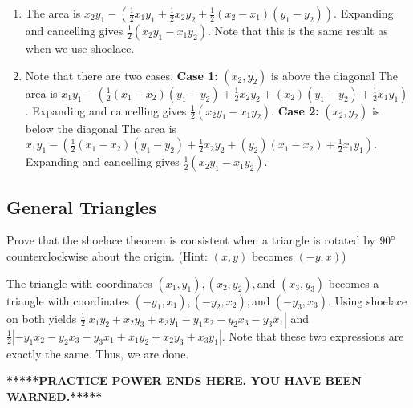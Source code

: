 \documentclass[11pt]{article}
\begin{document}
\begin{solution}
\begin{enumerate}[label=(\alph*)]
\phantom{hello what's up}
\item The area is $x_2y_1 - (\frac{1}{2}x_1y_1+\frac{1}{2}x_2y_2+\frac{1}{2}(x_2-x_1)(y_1-y_2))$.
Expanding and cancelling gives $\frac{1}{2}(x_2y_1-x_1y_2)$. Note that this is the same result as when we use shoelace.

\item Note that there are two cases. 
\newline \textbf{Case 1:} $(x_2, y_2)$ is above the diagonal
The area is $x_1y_1 - (\frac{1}{2}(x_1-x_2)(y_1-y_2)+\frac{1}{2}x_2y_2+(x_2)(y_1-y_2)+\frac{1}{2}x_1y_1)$.
Expanding and cancelling gives $\frac{1}{2}(x_2y_1-x_1y_2)$. 
\newline \textbf{Case 2:} $(x_2, y_2)$ is below the diagonal
The area is $x_1y_1 - (\frac{1}{2}(x_1-x_2)(y_1-y_2)+\frac{1}{2}x_2y_2+(y_2)(x_1-x_2)+\frac{1}{2}x_1y_1)$.
Expanding and cancelling gives $\frac{1}{2}(x_2y_1-x_1y_2)$. 

\end{enumerate} \end{solution}

\subsection{General Triangles}

\begin{problem}  Prove that the shoelace theorem is consistent when a triangle is rotated by $90\degree$ counterclockwise about the origin. (Hint: $(x, y)$ becomes $(-y, x)$)
\end{problem}

\begin{solution}
The triangle with coordinates $(x_1, y_1), (x_2, y_2),$and $(x_3, y_3)$ becomes a triangle with coordinates $(-y_1, x_1), (-y_2, x_2),$and $(-y_3, x_3)$. Using shoelace on both yields $\frac{1}{2}|x_1y_2+x_2y_3+x_3y_1-y_1x_2-y_2x_3-y_3x_1|$ and $\frac{1}{2}|-y_1x_2-y_2x_3-y_3x_1+x_1y_2+x_2y_3+x_3y_1|$. Note that these two expressions are exactly the same. Thus, we are done.
\end{solution}

\begin{center}\textbf{*****PRACTICE POWER ENDS HERE. YOU HAVE BEEN WARNED.*****}\end{center}
\end{document}
